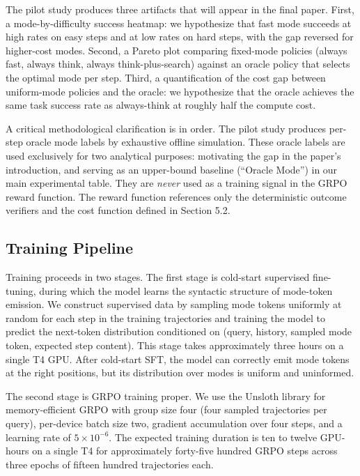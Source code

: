 \documentclass[11pt,a4paper]{article}
\begin{document}
The pilot study produces three artifacts that will appear in the final paper. First, a mode-by-difficulty success heatmap: we hypothesize that fast mode succeeds at high rates on easy steps and at low rates on hard steps, with the gap reversed for higher-cost modes. Second, a Pareto plot comparing fixed-mode policies (always fast, always think, always think-plus-search) against an oracle policy that selects the optimal mode per step. Third, a quantification of the cost gap between uniform-mode policies and the oracle: we hypothesize that the oracle achieves the same task success rate as always-think at roughly half the compute cost.

A critical methodological clarification is in order. The pilot study produces per-step oracle mode labels by exhaustive offline simulation. These oracle labels are used exclusively for two analytical purposes: motivating the gap in the paper's introduction, and serving as an upper-bound baseline (``Oracle Mode'') in our main experimental table. They are \textit{never} used as a training signal in the GRPO reward function. The reward function references only the deterministic outcome verifiers and the cost function defined in Section 5.2.

\subsection{Training Pipeline}

Training proceeds in two stages. The first stage is cold-start supervised fine-tuning, during which the model learns the syntactic structure of mode-token emission. We construct supervised data by sampling mode tokens uniformly at random for each step in the training trajectories and training the model to predict the next-token distribution conditioned on (query, history, sampled mode token, expected step content). This stage takes approximately three hours on a single T4 GPU. After cold-start SFT, the model can correctly emit mode tokens at the right positions, but its distribution over modes is uniform and uninformed.

The second stage is GRPO training proper. We use the Unsloth library for memory-efficient GRPO with group size four (four sampled trajectories per query), per-device batch size two, gradient accumulation over four steps, and a learning rate of $5 \times 10^{-6}$. The expected training duration is ten to twelve GPU-hours on a single T4 for approximately forty-five hundred GRPO steps across three epochs of fifteen hundred trajectories each.
\end{document}
